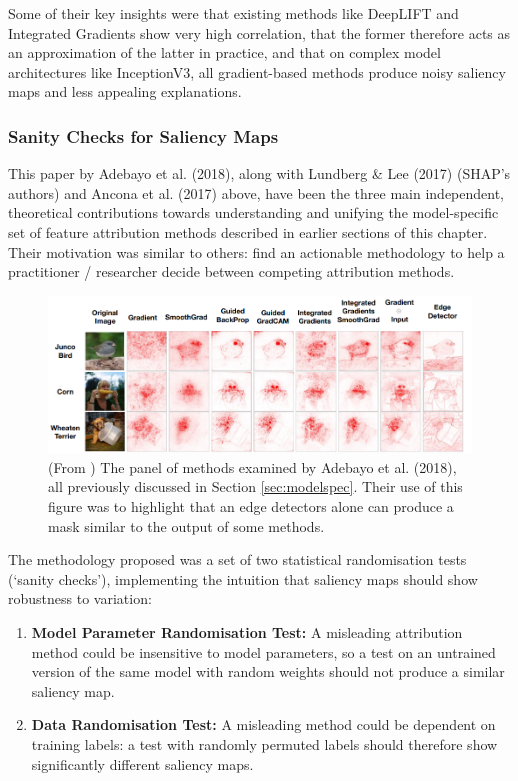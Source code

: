 \documentclass[main]{subfiles}
\begin{document}
Some of their key insights were that existing methods like DeepLIFT and Integrated Gradients show very high correlation, that the former therefore acts as an approximation of the latter in practice, and that on complex model architectures like InceptionV3, all gradient-based methods produce noisy saliency maps and less appealing explanations.

\subsubsection{Sanity Checks for Saliency Maps \cite{sanity}}




This paper by Adebayo et al. (2018), along with Lundberg \& Lee (2017) (SHAP's authors) and Ancona et al. (2017) above, have  been the three main independent, theoretical contributions towards understanding and unifying the model-specific set of feature attribution methods described in earlier sections of this chapter. Their motivation was similar to others: find an actionable methodology to help a practitioner / researcher decide between competing attribution methods.

\begin{figure}[h]
\centering
\includegraphics[scale=0.55]{adebayo_panel.png}
\caption{(From \cite{sanity}) The panel of methods examined by Adebayo et al. (2018), all previously discussed in Section \ref{sec:modelspec}. Their use of this figure was to highlight that an edge detectors alone can produce a mask similar to the output of some methods.}
\label{adebayoimg}
\end{figure}


The methodology proposed was a set of two statistical randomisation tests (`sanity checks'), implementing the intuition that saliency maps should show robustness to variation:

\begin{enumerate}
\item \textbf{Model Parameter Randomisation Test:} A misleading attribution method could be insensitive to model parameters, so a test on an untrained version of the same model with random weights should not produce a similar saliency map.
\item \textbf{Data Randomisation Test:} A misleading method could be dependent on training labels: a test with randomly permuted labels should therefore show significantly different saliency maps.
\end{enumerate}
\end{document}

